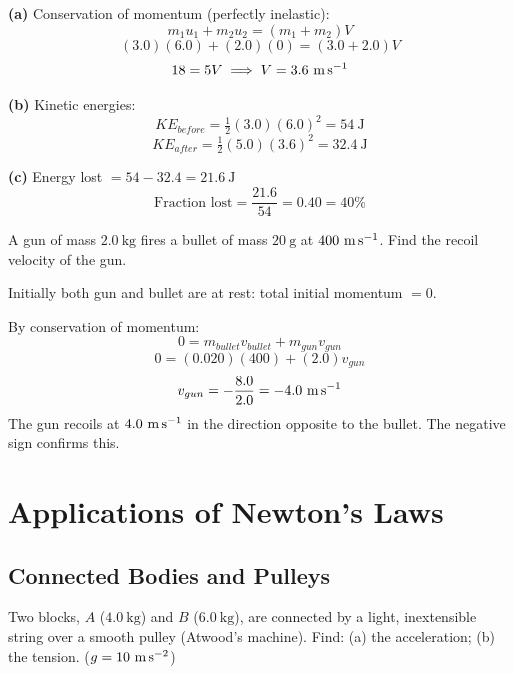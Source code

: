 \begin{solutionbox}
\textbf{(a)} Conservation of momentum (perfectly
inelastic):
\[
  m_1u_1 + m_2u_2 = (m_1+m_2)V
\]
\[
  (3.0)(6.0) + (2.0)(0) = (3.0+2.0)V
\]
\[
  18 = 5V \implies V = 3.6\ \text{m\,s}^{-1}
\]

\textbf{(b)} Kinetic energies:
\[
  KE_{before}
  = \tfrac{1}{2}(3.0)(6.0)^2 = 54\ \text{J}
\]
\[
  KE_{after}
  = \tfrac{1}{2}(5.0)(3.6)^2 = 32.4\ \text{J}
\]

\textbf{(c)} Energy lost $= 54 - 32.4 = 21.6\ \text{J}$
\[
  \text{Fraction lost}
  = \frac{21.6}{54} = 0.40 = 40\%
\]
\end{solutionbox}

\begin{examplebox}[4.3]
A gun of mass $2.0\ \text{kg}$ fires a bullet of mass
$20\ \text{g}$ at $400\ \text{m\,s}^{-1}$.
Find the recoil velocity of the gun.
\end{examplebox}

\begin{solutionbox}
Initially both gun and bullet are at rest:
total initial momentum $= 0$.

By conservation of momentum:
\[
  0 = m_{bullet}v_{bullet} + m_{gun}v_{gun}
\]
\[
  0 = (0.020)(400) + (2.0)v_{gun}
\]
\[
  v_{gun} = -\frac{8.0}{2.0} = -4.0\ \text{m\,s}^{-1}
\]
The gun recoils at $4.0\ \text{m\,s}^{-1}$ in the
direction opposite to the bullet. The negative sign
confirms this.
\end{solutionbox}

\section{Applications of Newton's Laws}

\subsection{Connected Bodies and Pulleys}

\begin{examplebox}[4.4]
Two blocks, $A$ ($4.0\ \text{kg}$) and $B$
($6.0\ \text{kg}$), are connected by a light,
inextensible string over a smooth pulley (Atwood's
machine). Find: (a) the acceleration; (b) the tension.
($g = 10\ \text{m\,s}^{-2}$)
\end{examplebox}

